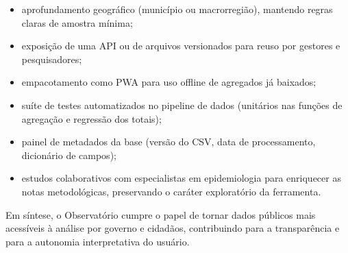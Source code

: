 \begin{itemize}
	\item aprofundamento geográfico (município ou macrorregião), mantendo regras claras de amostra mínima;
	\item exposição de uma \acs{API} ou de arquivos versionados para reuso por gestores e pesquisadores;
	\item empacotamento como \acs{PWA} para uso offline de agregados já baixados;
	\item suíte de testes automatizados no pipeline de dados (unitários nas funções de agregação e regressão dos totais);
	\item painel de metadados da base (versão do \acs{CSV}, data de processamento, dicionário de campos);
	\item estudos colaborativos com especialistas em epidemiologia para enriquecer as notas metodológicas, preservando o caráter exploratório da ferramenta.
\end{itemize}

Em síntese, o Observatório cumpre o papel de tornar dados públicos mais acessíveis à análise por governo e cidadãos, contribuindo para a transparência e para a autonomia interpretativa do usuário.
